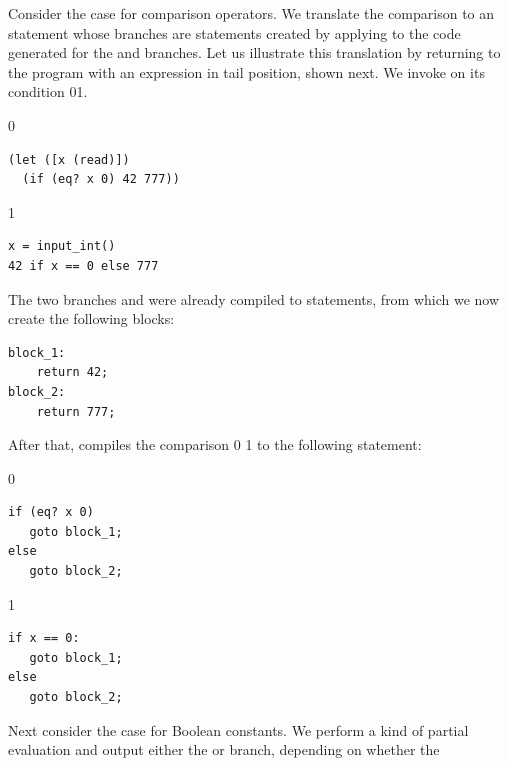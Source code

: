 \documentclass[7x10]{TimesAPriori_MIT}%
\def\racketEd{0}
\def\pythonEd{1}
\def\edition{1}
\newcommand{\racket}[1]{{\if\edition\racketEd{#1}\fi}}
\newcommand{\pythonColor}[0]{}
\newcommand{\python}[1]{{\if\edition\pythonEd\pythonColor #1\fi}}
\numberwithin{theorem}{chapter}
\numberwithin{definition}{chapter}
\numberwithin{equation}{chapter}
\begin{document}
Consider the case for comparison operators. We translate the
comparison to an  statement whose branches are 
statements created by applying  to the code
generated for the  and  branches. Let us
illustrate this translation by returning to the program with an
 expression in tail position, shown next. We invoke
 on its condition
\racket{}\python{}.
%
{\if\edition\racketEd
\begin{lstlisting}
(let ([x (read)])
  (if (eq? x 0) 42 777))
\end{lstlisting}
\fi}
%
{\if\edition\pythonEd\pythonColor
\begin{lstlisting}
x = input_int()
42 if x == 0 else 777
\end{lstlisting}
\fi}
%
\noindent The two branches  and  were already
compiled to  statements, from which we now create the
following blocks:
%
\begin{center}
\begin{minipage}{\textwidth}
\begin{lstlisting}
block_1:
    return 42;
block_2:
    return 777;
\end{lstlisting}
  \end{minipage}
\end{center}
%
After that,  compiles the comparison
\racket{}
\python{}
to the following  statement:
%
{\if\edition\racketEd
\begin{center}
\begin{minipage}{\textwidth}
\begin{lstlisting}
if (eq? x 0)
   goto block_1;
else
   goto block_2;
\end{lstlisting}
\end{minipage}
\end{center}
\fi}
{\if\edition\pythonEd\pythonColor
\begin{center}
\begin{minipage}{\textwidth}
\begin{lstlisting}
if x == 0:
   goto block_1;
else
   goto block_2;
\end{lstlisting}
\end{minipage}
\end{center}
\fi}
Next consider the case for Boolean constants. We perform a kind of
partial evaluation and output
either the  or  branch, depending on whether the
\end{document}
